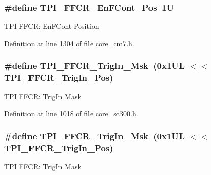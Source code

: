 \subsubsection[{\texorpdfstring{T\+P\+I\+\_\+\+F\+F\+C\+R\+\_\+\+En\+F\+Cont\+\_\+\+Pos}{TPI_FFCR_EnFCont_Pos}}]{\setlength{\rightskip}{0pt plus 5cm}\#define T\+P\+I\+\_\+\+F\+F\+C\+R\+\_\+\+En\+F\+Cont\+\_\+\+Pos~1U}\hypertarget{group___c_m_s_i_s___t_p_i_ga99e58a0960b275a773b245e2b69b9a64}{}\label{group___c_m_s_i_s___t_p_i_ga99e58a0960b275a773b245e2b69b9a64}
T\+PI F\+F\+CR\+: En\+F\+Cont Position 

Definition at line 1304 of file core\+\_\+cm7.\+h.

\subsubsection[{\texorpdfstring{T\+P\+I\+\_\+\+F\+F\+C\+R\+\_\+\+Trig\+In\+\_\+\+Msk}{TPI_FFCR_TrigIn_Msk}}]{\setlength{\rightskip}{0pt plus 5cm}\#define T\+P\+I\+\_\+\+F\+F\+C\+R\+\_\+\+Trig\+In\+\_\+\+Msk~(0x1\+U\+L $<$$<$ T\+P\+I\+\_\+\+F\+F\+C\+R\+\_\+\+Trig\+In\+\_\+\+Pos)}\hypertarget{group___c_m_s_i_s___t_p_i_ga360b413bc5da61f751546a7133c3e4dd}{}\label{group___c_m_s_i_s___t_p_i_ga360b413bc5da61f751546a7133c3e4dd}
T\+PI F\+F\+CR\+: Trig\+In Mask 

Definition at line 1018 of file core\+\_\+sc300.\+h.

\subsubsection[{\texorpdfstring{T\+P\+I\+\_\+\+F\+F\+C\+R\+\_\+\+Trig\+In\+\_\+\+Msk}{TPI_FFCR_TrigIn_Msk}}]{\setlength{\rightskip}{0pt plus 5cm}\#define T\+P\+I\+\_\+\+F\+F\+C\+R\+\_\+\+Trig\+In\+\_\+\+Msk~(0x1\+U\+L $<$$<$ T\+P\+I\+\_\+\+F\+F\+C\+R\+\_\+\+Trig\+In\+\_\+\+Pos)}\hypertarget{group___c_m_s_i_s___t_p_i_ga360b413bc5da61f751546a7133c3e4dd}{}\label{group___c_m_s_i_s___t_p_i_ga360b413bc5da61f751546a7133c3e4dd}
T\+PI F\+F\+CR\+: Trig\+In Mask 

